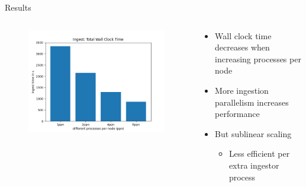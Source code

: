 \documentclass[compress,aspectratio=169]{beamer}
\begin{document}
  \begin{frame}{Results}
    \begin{columns}
      \begin{column}{0.5\textwidth}
        \begin{figure}
          \includegraphics[height=0.9\textwidth]{./analysis/wallclocktime.png}
        \end{figure}
      \end{column}
      \begin{column}{0.5\textwidth}
        \begin{itemize}
          \item Wall clock time decreases when increasing processes per node
          \item More ingestion parallelism increases performance
          \item But sublinear scaling
            \begin{itemize}
              \item Less efficient per extra ingestor process
            \end{itemize}
        \end{itemize}
      \end{column}
    \end{columns}
  \end{frame}
\end{document}
